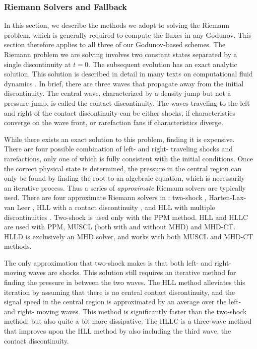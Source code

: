 \subsubsection{Riemann Solvers and Fallback}
\label{sec.riemann}

In this section, we describe the methods we adopt to solving the Riemann
problem, which is generally required to compute the fluxes in 
any Godunov.  This section therefore applies to all three of our 
Godunov-based schemes.  The Riemann problem we are solving
involves two constant states separated by a single discontinuity at $t=0$.
The subsequent evolution has an exact analytic solution.  This solution is
described in detail in many texts on computational fluid dynamics
\citep[e.g.,][]{toro-1997}.   In brief, there are three waves that propagate
away from the initial discontinuity.  The central wave, characterized by a
density jump but not a pressure jump, is called the contact discontinuity.  The
waves traveling to the left and right of the contact discontinuity can be either
shocks, if characteristics converge on the wave front, or rarefaction fans if
characteristics diverge.  

While there exists an exact solution to this problem, finding it is expensive.  There are four
possible combination of left- and right- traveling shocks and rarefactions,
only one of which is fully consistent with the initial conditions.  Once the
correct physical state is determined, the pressure in the central region can
only be found by finding the root to an algebraic equation, which is necessarily
an iterative process.  Thus a series of \emph{approximate} Riemann solvers are
typically used.  There are four approximate Riemann solvers in \enzo: two-shock
\citep{toro-1997},
Harten-Lax-van Leer \citep[HLL,][]{toro-1997}, HLL with a contact discontinuity
 \citep[HLLC,][]{toro-1997}, and HLL with
multiple discontinuities \citep[HLLD,][]{Miyoshi05}.  Two-shock is used only
with the PPM method.  HLL and HLLC are used with PPM, MUSCL (both with and
without MHD) and MHD-CT.  HLLD is exclusively an MHD solver, and works with both
MUSCL and MHD-CT methods.  

The only approximation that two-shock makes is that both left- and right- moving
waves are shocks.  This solution still requires an iterative method for finding
the pressure in between the two waves.  The HLL method alleviates this iteration
by assuming that there is no central contact discontinuity, and the signal speed
in the central region is approximated by an average over the left- and right-
moving waves.  This method is significantly faster than the two-shock method,
but also quite a bit more dissipative.  The HLLC is a three-wave method that improves upon the HLL
method by also including the third wave, the contact discontinuity.  

